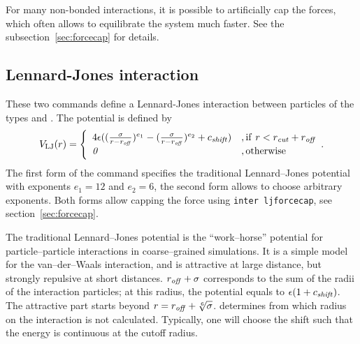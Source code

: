 For many non-bonded interactions, it is possible to artificially cap the forces,
which often allows to equilibrate the system much faster. See the
subsection~\ref{sec:forcecap} for details.

\subsection{Lennard-Jones interaction}

\begin{essyntax}

  \begin{features}
  \end{features}
\end{essyntax}

These two commands define a Lennard-Jones interaction between particles of the
types  and .  The potential is defined by
\begin{equation}
  \label{eq:lj}
  V_\mathrm{LJ}(r) = \Biggl\{
    \begin{array}{ll}
      4\epsilon((\frac{\sigma}{r-r_\text{\mbox{\textrm{\textit{off}}}}})^{e_1}
      -(\frac{\sigma}{r-r_\text{\mbox{\textrm{\textit{off}}}}})^{e_2}+c_\text{\mbox{\textrm{\textit{shift}}}}) 
      & \mathrm{, if~} r < r_\text{\mbox{\textrm{\textit{cut}}}}+r_\text{\mbox{\textrm{\textit{off}}}}\\
      \mathit{0} 
      & \mathrm{, otherwise}\\
    \end{array}.
\end{equation}
The first form of the command specifies the traditional Lennard--Jones potential
with exponents $e_1=12$ and $e_2=6$, the second form allows to choose arbitrary
exponents. Both forms allow capping the force using {\tt inter ljforcecap},
see section~\ref{sec:forcecap}.

The traditional Lennard--Jones potential is the ``work--horse'' potential for
particle--particle interactions in coarse--grained simulations. It is a simple
model for the van--der--Waals interaction, and is attractive at large distance,
but strongly repulsive at short distances. $r_\text{\mbox{\textrm{\textit{off}}}} + \sigma$
corresponds to the sum of the radii of the interaction particles; at this
radius, the potential equals to $\epsilon(1+c_\text{\mbox{\textrm{\textit{shift}}}})$. The
attractive part starts beyond $r=r_\text{\mbox{\textrm{\textit{off}}}} + \sqrt[6]\sigma$.
 determines from which radius on the interaction is not
calculated. Typically, one will choose the shift such that the energy is
continuous at the cutoff radius.

